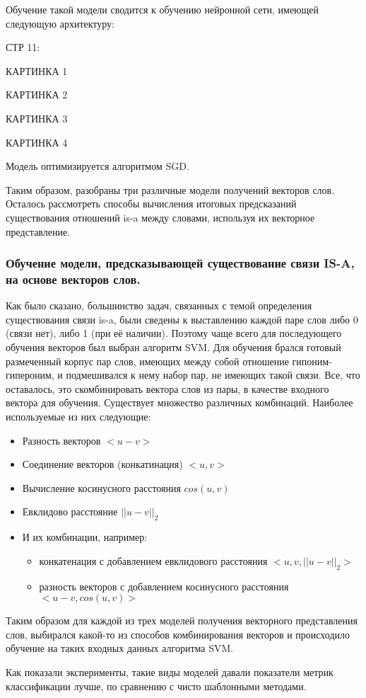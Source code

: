 Обучение такой модели сводится к обучению нейронной сети, имеющей
следующую архитектуру:

СТР 11:

КАРТИНКА 1

КАРТИНКА 2

КАРТИНКА 3

КАРТИНКА 4

Модель оптимизируется алгоритмом SGD.

Таким образом, разобраны три различные модели получений векторов слов.
Осталось рассмотреть способы вычисления итоговых предсказаний существования
отношений is-a между словами, используя их векторное представление.



\subsubsection{Обучение модели, предсказывающей существование связи IS-A, на основе векторов слов.}

Как было сказано, большинство задач, связанных с темой определения
существования связи is-a, были сведены к выставлению каждой паре слов либо 0
(связи нет), либо 1 (при её наличии). Поэтому чаще всего для последующего
обучения векторов был выбран алгоритм SVM.
Для обучения брался готовый размеченный корпус пар слов, имеющих между
собой отношение гипоним-гипероним, и подмешивался к нему набор пар, не
имеющих такой связи. Все, что оставалось, это скомбинировать вектора слов из
пары, в качестве входного вектора для обучения.
Существует множество различных комбинаций. Наиболее используемые из них
следующие:

\begin{itemize}
\item Разность векторов $<u - v>$
\item Соединение векторов (конкатинация) $<u, v>$
\item Вычисление косинусного расстояния $cos(u, v)$
\item Евклидово расстояние $|| u - v ||_2$
\item И их комбинации, например:
\begin{itemize}
\item конкатенация с добавлением евклидового расстояния $<u, v, || u - v ||_2>$
\item разность векторов с добавлением косинусного расстояния$<u - v, cos(u, v)>$
\end{itemize}
\end{itemize}

Таким образом для каждой из трех моделей получения векторного представления
слов, выбирался какой-то из способов комбинирования векторов и происходило
обучение на таких входных данных алгоритма SVM.

Как показали эксперименты, такие виды моделей давали показатели метрик
классификации лучше, по сравнению с чисто шаблонными методами.